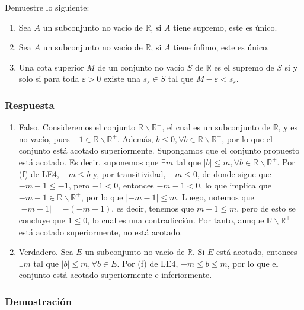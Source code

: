 \documentclass[11pt]{article}
\newcommand{\R}{\mathbb{R}}
\begin{document}
Demuestre lo siguiente:

\begin{enumerate}[label=\arabic*., resume]
    \item Sea $A$ un subconjunto no vacío de $\R$, si $A$ tiene supremo, este es único.
    \item Sea $A$ un subconjunto no vacío de $\R$, si $A$ tiene ínfimo, este es único.
    \item Una cota superior $M$ de un conjunto no vacío $S$ de $\R$ es el supremo de $S$ si y solo si para toda $\varepsilon>0$ existe una $s_\varepsilon \in S$ tal que $M-\varepsilon<s_\varepsilon$.
\end{enumerate}

\subsubsection*{Respuesta}

\begin{enumerate}[label=\arabic*.]
    \item Falso. Consideremos el conjunto $\R\backslash \R^+$, el cual es un subconjunto de $\R$, y es no vacío, pues $-1\in \R\backslash \R^+$. Además, $b\leq 0, \forall b\in \R\backslash\R^+$, por lo que el conjunto está acotado superiormente. Supongamos que el conjunto propuesto está acotado. Es decir, suponemos que $\exists m$ tal que $|b|\leq m, \forall b\in \R\backslash \R^+$. Por (f) de LE4, $-m \leq b$ y, por transitividad, $-m\leq 0$, de donde sigue que $-m-1\leq -1$, pero $-1<0$, entonces $-m-1<0$, lo que implica que $-m-1\in \R\backslash \R^+$, por lo que $|-m-1|\leq m$. Luego, notemos que $|-m-1|=-(-m-1)$, es decir, tenemos que $m+1\leq m$, pero de esto se concluye que $1\leq 0$, lo cual es una contradicción. Por tanto, aunque $\R\backslash \R^+$ está acotado superiormente, no está acotado.
    \item Verdadero. Sea $E$ un subconjunto no vacío de $\R$. Si $E$ está acotado, entonces $\exists m$ tal que $|b|\leq m,\forall b \in E$. Por (f) de LE4, $-m\leq b \leq m$, por lo que el conjunto está acotado superiormente e inferiormente.
\end{enumerate}

\subsubsection*{Demostración}
\end{document}

